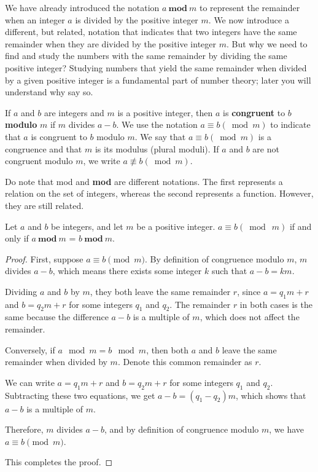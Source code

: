     We have already introduced the notation $ a\ \textbf{mod}\ m $ to represent the remainder when an integer
    $a$ is divided by the positive integer $m$. We now introduce a different, but related, notation
    that indicates that two integers have the same remainder when they are divided by the positive
    integer $m$. But why we need to find and study the numbers with the same remainder by dividing 
    the same positive integer? Studying numbers that yield the same remainder when divided by a given positive integer is a
    fundamental part of number theory; later you will understand why say so.
    \begin{definition}
        If $a$ and $b$ are integers and $m$ is a positive integer, then $a$ is \textbf{congruent} 
        to $b$ \textbf{modulo} $m$ if $m$ divides $a - b$. 
        We use the notation $a \equiv b (\bmod m)$ to indicate that $a$ is congruent to $b$ modulo 
        $m$. We say that $a \equiv b (\bmod m)$ is a congruence and that $m$ is its modulus 
        (plural moduli). If $a$ and $b$ are not congruent modulo $m$, we write $a \not\equiv b (\bmod m)$.
    \end{definition}
    Do note that mod and \textbf{mod} are different notations. The first represents a relation on the set of integers, whereas the
    second represents a function. However, they are still related.
    \begin{theorem}
        Let $a$ and $b$ be integers, and let $m$ be a positive integer. $a \equiv b (\bmod \  m)$ if and only if $a\ \textbf{mod}\ m$ = $b\ \textbf{mod}\ m$.
    \end{theorem}
    \begin{proof}
        First, suppose \( a \equiv b \pmod{m} \). By definition of congruence modulo \( m \), \( m \) divides \( a - b \), which means there exists some integer \( k \) such that \( a - b = km \).

        Dividing \( a \) and \( b \) by \( m \), they both leave the same remainder \( r \), since \( a = q_1m + r \) and \( b = q_2m + r \) for some integers \( q_1 \) and \( q_2 \). The remainder \( r \) in both cases is the same because the difference \( a - b \) is a multiple of \( m \), which does not affect the remainder.

        Conversely, if \( a \mod m = b \mod m \), then both \( a \) and \( b \) leave the same remainder when divided by \( m \). Denote this common remainder as \( r \).

        We can write \( a = q_1m + r \) and \( b = q_2m + r \) for some integers \( q_1 \) and \( q_2 \). Subtracting these two equations, we get \( a - b = (q_1 - q_2)m \), which shows that \( a - b \) is a multiple of \( m \).

        Therefore, \( m \) divides \( a - b \), and by definition of congruence modulo \( m \), we have \( a \equiv b \pmod{m} \).

        This completes the proof.
    \end{proof}

